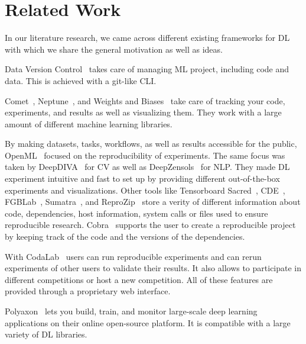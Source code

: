 \documentclass[runningheads]{llncs}
\begin{document}
%
 
\section{Related Work}
In our literature research, we came across different existing frameworks for \ac{DL} with which we share the general motivation as well as ideas.


Data Version Control~\cite{controlDataVersionControl2022} takes care of managing \ac{ML} project, including code and data.
This is achieved with a git-like \ac{CLI}.

Comet~\cite{CometSuperchargeMachine2022}, Neptune~\cite{NeptuneAiMetadata2022}, and Weights and Biases~\cite{biewaldExperimentTrackingWeights2020} take care of tracking your code, experiments, and results as well as visualizing them.
They work with a large amount of different machine learning libraries.

By making datasets, tasks, workflows, as well as results accessible for the public, OpenML~\cite{vanschorenOpenMLNetworkedScience2013} focused on the reproducibility of experiments.
The same focus was taken by DeepDIVA~\cite{albertiImprovingReproducibleDeep2019} for \ac{CV} as well as DeepZensols~\cite{landesDeepZensolsDeepNatural2021} for \ac{NLP}.
They made \ac{DL} experiment intuitive and fast to set up by providing different out-of-the-box experiments and visualizations.
Other tools like Tensorboard Sacred~\cite{greffSacredInfrastructureComputational2017}, CDE~\cite{guoCDEToolCreating2012}, FGBLab~\cite{arulkumaranFGLabMachineLearning2016}, Sumatra~\cite{davisonAutomatedCaptureExperiment2012}, and ReproZip~\cite{chirigatiReprozipComputationalReproducibility2016} store a verity of different information about code, dependencies, host information, system calls or files used to ensure reproducible research.
Cobra~\cite{vogtlinCobraCLITool2020} supports the user to create a reproducible project by keeping track of the code and the versions of the dependencies.

With CodaLab~\cite{CodaLab2022} users can run reproducible experiments and can rerun experiments of other users to validate their results.
It also allows to participate in different competitions or host a new competition.
All of these features are provided through a proprietary web interface.

Polyaxon~\cite{PolyaxonMachineLearning2022} lets you build, train, and monitor large-scale deep learning applications on their online open-source platform.
It is compatible with a large variety of \ac{DL} libraries.
\end{document}
